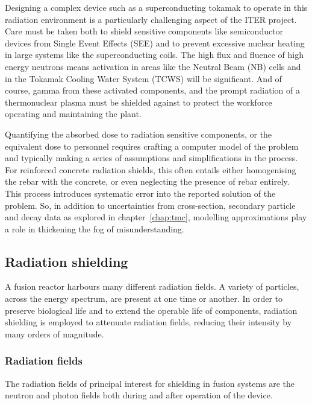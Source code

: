 Designing a complex device such as a superconducting tokamak to operate in this radiation environment is a particularly challenging aspect of the ITER project. Care must be taken both to shield sensitive components like semiconductor devices from Single Event Effects (SEE) and to prevent excessive nuclear heating in large systems like the superconducting coils. The high flux and fluence of high energy neutrons means activation in areas like the Neutral Beam (NB) cells and in the Tokamak Cooling Water System (TCWS) will be significant. And of course, gamma from these activated components, and the prompt radiation of a thermonuclear plasma must be shielded against to protect the workforce operating and maintaining the plant.

Quantifying the absorbed dose to radiation sensitive components, or the equivalent dose to personnel requires crafting a computer model of the problem and typically making a series of assumptions and simplifications in the process. For reinforced concrete radiation shields, this often entails either homogenising the rebar with the concrete, or even neglecting the presence of rebar entirely. This process introduces systematic error into the reported solution of the problem. So, in addition to uncertainties from cross-section, secondary particle and decay data as explored in chapter~\ref{chap:tmc}, modelling approximations play a role in thickening the fog of misunderstanding. 

\subsection{Radiation shielding}
A fusion reactor harbours many different radiation fields. A variety of particles, across the energy spectrum, are present at one time or another. In order to preserve biological life and to extend the operable life of components, radiation shielding is employed to attenuate radiation fields, reducing their intensity by many orders of magnitude.

\subsubsection{Radiation fields}
The radiation fields of principal interest for shielding in fusion systems are the neutron and photon fields both during and after operation of the device.

